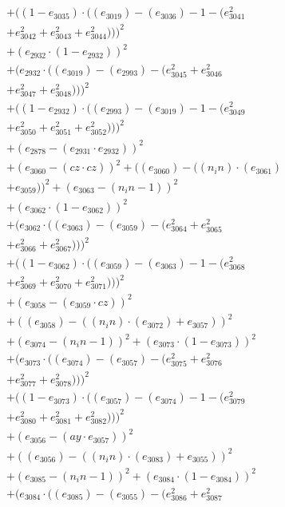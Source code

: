 \documentclass[10pt, a4paper]{article}
\begin{document}
\begin{small}
\begin{align*}
& + ((1 - e_{3035})  \cdot  ((e_{3019}) - (e_{3036}) - 1 - (e_{3041}^{2} \\
& + e_{3042}^{2} + e_{3043}^{2} + e_{3044}^{2})))^{2} \\
& + (e_{2932}  \cdot  (1 - e_{2932}))^{2} \\
& + (e_{2932}  \cdot  ((e_{3019}) - (e_{2993}) - (e_{3045}^{2} + e_{3046}^{2} \\
& + e_{3047}^{2} + e_{3048}^{2})))^{2} \\
& + ((1 - e_{2932})  \cdot  ((e_{2993}) - (e_{3019}) - 1 - (e_{3049}^{2} \\
& + e_{3050}^{2} + e_{3051}^{2} + e_{3052}^{2})))^{2} \\
& + (e_{2878} - (e_{2931}  \cdot  e_{2932}))^{2} \\
& + (e_{3060} - (cz  \cdot  cz))^{2} + ((e_{3060}) - ((n_in)  \cdot  (e_{3061}) \\
& + e_{3059}))^{2} + (e_{3063} - (n_in - 1))^{2} \\
& + (e_{3062}  \cdot  (1 - e_{3062}))^{2} \\
& + (e_{3062}  \cdot  ((e_{3063}) - (e_{3059}) - (e_{3064}^{2} + e_{3065}^{2} \\
& + e_{3066}^{2} + e_{3067}^{2})))^{2} \\
& + ((1 - e_{3062})  \cdot  ((e_{3059}) - (e_{3063}) - 1 - (e_{3068}^{2} \\
& + e_{3069}^{2} + e_{3070}^{2} + e_{3071}^{2})))^{2} \\
& + (e_{3058} - (e_{3059}  \cdot  cz))^{2} \\
& + ((e_{3058}) - ((n_in)  \cdot  (e_{3072}) + e_{3057}))^{2} \\
& + (e_{3074} - (n_in - 1))^{2} + (e_{3073}  \cdot  (1 - e_{3073}))^{2} \\
& + (e_{3073}  \cdot  ((e_{3074}) - (e_{3057}) - (e_{3075}^{2} + e_{3076}^{2} \\
& + e_{3077}^{2} + e_{3078}^{2})))^{2} \\
& + ((1 - e_{3073})  \cdot  ((e_{3057}) - (e_{3074}) - 1 - (e_{3079}^{2} \\
& + e_{3080}^{2} + e_{3081}^{2} + e_{3082}^{2})))^{2} \\
& + (e_{3056} - (ay  \cdot  e_{3057}))^{2} \\
& + ((e_{3056}) - ((n_in)  \cdot  (e_{3083}) + e_{3055}))^{2} \\
& + (e_{3085} - (n_in - 1))^{2} + (e_{3084}  \cdot  (1 - e_{3084}))^{2} \\
& + (e_{3084}  \cdot  ((e_{3085}) - (e_{3055}) - (e_{3086}^{2} + e_{3087}^{2} \\

\end{align*}
\end{small}
\end{document}
